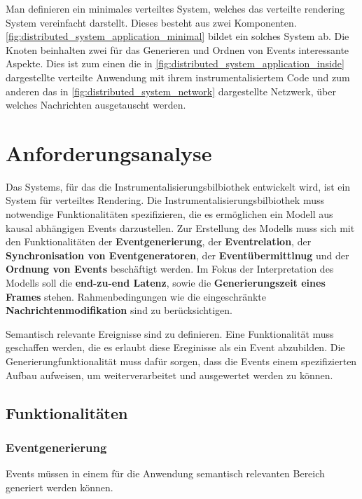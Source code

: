 Man definieren ein minimales verteiltes System, welches das verteilte rendering System vereinfacht darstellt. Dieses besteht aus zwei Komponenten. \cref{fig:distributed_system_application_minimal} bildet ein solches System ab. Die Knoten beinhalten zwei für das Generieren und Ordnen von Events interessante Aspekte. Dies ist zum einen die in \cref{fig:distributed_system_application_inside} dargestellte verteilte Anwendung mit ihrem instrumentalisiertem Code und zum anderen das in \cref{fig:distributed_system_network} dargestellte Netzwerk, über welches Nachrichten ausgetauscht werden.


\section{Anforderungsanalyse}
\label{section:Anforderungsanalyse}

Das Systems, für das die Instrumentalisierungsbilbiothek entwickelt wird, ist ein System für verteiltes Rendering. Die Instrumentalisierungsbilbiothek muss notwendige Funktionalitäten spezifizieren, die es ermöglichen ein Modell aus kausal abhängigen Events darzustellen. Zur Erstellung des Modells muss sich mit den Funktionalitäten der \textbf{Eventgenerierung}, der \textbf{Eventrelation}, der \textbf{Synchronisation von Eventgeneratoren}, der \textbf{Eventübermittlnug} und der \textbf{Ordnung von Events} beschäftigt werden. Im Fokus der Interpretation des Modells soll die \textbf{end-zu-end Latenz}, sowie die \textbf{Generierungszeit eines Frames} stehen. Rahmenbedingungen wie die eingeschränkte \textbf{Nachrichtenmodifikation} sind zu berücksichtigen.

 Semantisch relevante Ereignisse sind zu definieren. Eine Funktionalität muss geschaffen werden, die es erlaubt diese Ereginisse als ein Event abzubilden. Die Generierungfunktionalität muss dafür sorgen, dass die Events einem spezifizierten Aufbau aufweisen, um weiterverarbeitet und ausgewertet werden zu können.
\subsection{Funktionalitäten}
\subsubsection{Eventgenerierung}
\label{section:Eventgenerierung}
Events müssen in einem für die Anwendung semantisch relevanten Bereich generiert werden können. 



